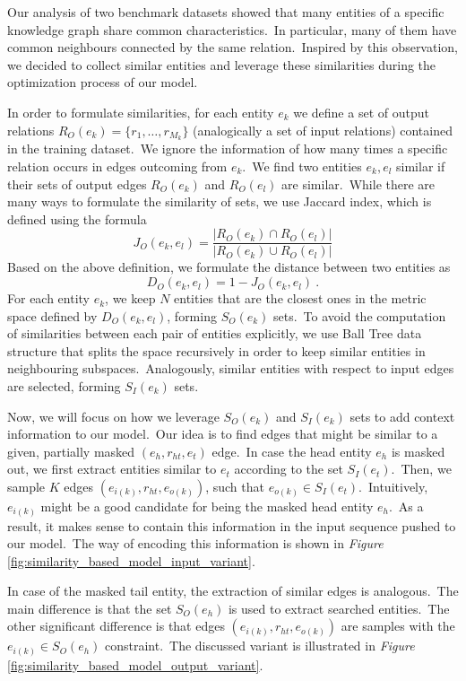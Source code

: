 \documentclass[longabstract, english, mgr]{iithesis}
\theoremstyle{default_theorem_style}\newtheorem{theorem}{Theorem}
\theoremstyle{default_theorem_style}\newtheorem{definition}{Definition}
\begin{document}
Our analysis of two benchmark datasets showed that many entities of a specific knowledge graph share common
characteristics.\ In particular, many of them have common neighbours connected by the same relation.\ Inspired by
this observation, we decided to collect similar entities and leverage these similarities during the optimization
process of our model.\newline

\noindent In order to formulate similarities, for each entity $e_k$ we define a set of output
relations $R_O(e_k) = \{r_1, \dots, r_{M_k}\}$ (analogically a set of input relations) contained in the training
dataset.\ We ignore the information of how many times a specific relation occurs in edges outcoming from
$e_k$.\ We find two entities $e_k, e_l$ similar if their sets of output edges $R_O(e_k)$ and $R_O(e_l)$ are
similar.\ While there are many ways to formulate the similarity of sets, we use Jaccard index, which is defined using
the formula
$$
J_O(e_k, e_l) = \frac{|R_O(e_k) \cap R_O(e_l)|}{|R_O(e_k) \cup R_O(e_l)|}
$$
Based on the above definition, we formulate the distance between two entities as
$$
D_O(e_k, e_l) = 1 - J_O(e_k, e_l)\ .
$$
For each entity $e_k$, we keep $N$ entities that are the closest ones in the metric space defined by
$D_O(e_k, e_l)$, forming $S_O(e_k)$ sets.\ To avoid the computation of similarities between each pair of entities
explicitly, we use Ball Tree data structure that splits the space recursively in order to keep similar entities
in neighbouring subspaces.\ Analogously, similar entities with respect to input edges are selected, forming
$S_I(e_k)$ sets.\newline

\noindent Now, we will focus on how we leverage $S_O(e_k)$ and $S_I(e_k)$ sets to add context information to our
model.\ Our idea is to find edges that might be similar to a given, partially masked $(e_h, r_{ht}, e_t)$
edge.\ In case the head entity $e_h$ is masked out, we first extract entities similar to $e_t$ according to the
set $S_I(e_t)$.\ Then, we sample $K$ edges $(e_{i(k)}, r_{ht}, e_{o(k)})$, such that
$e_{o(k)} \in S_I(e_t)$.\ Intuitively, $e_{i(k)}$ might be a good candidate for being the masked head entity $e_h$.\ As
a result, it makes sense to contain this information in the input sequence pushed to our model.\ The way of encoding
this information is shown in \textit{Figure} \ref{fig:similarity_based_model_input_variant}.\newline

\noindent In case of the masked tail entity, the extraction of similar edges is analogous.\ The main difference is
that the set $S_O(e_h)$ is used to extract searched entities.\ The other significant difference is that edges
$(e_{i(k)}, r_{ht}, e_{o(k)})$ are samples with the $e_{i(k)} \in S_O(e_h)$ constraint.\ The discussed variant is
illustrated in \textit{Figure} \ref{fig:similarity_based_model_output_variant}.\newline
\end{document}
